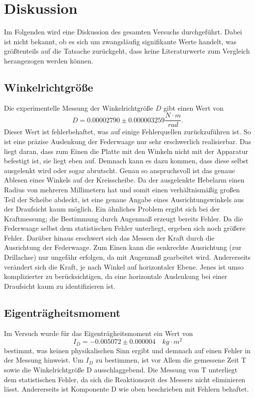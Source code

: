 \section{Diskussion}
\label{sec:Diskussion}

Im Folgenden wird eine Diskussion des gesamten Versuchs durchgeführt. Dabei
ist nicht bekannt, ob es sich um zwangsläufig signifikante Werte handelt, was
größtenteils auf die Tatsache zurückgeht, dass keine Literaturwerte zum 
Vergleich herangezogen werden können.

\subsection{Winkelrichtgröße}
\label{chap:winkelrichtgroesse}
Die experimentelle Messung der Winkelrichtgröße $D$ gibt einen Wert von
\begin{equation}
    D = 0.00002790 \pm 0.000003259 \frac{N \cdot m}{rad}.
\end{equation}
Dieser Wert ist fehlerbehaftet, was auf einige Fehlerquellen zurückzuführen
ist. So ist eine präzise Auslenkung der Federwaage nur sehr erschwerlich
realisierbar. Das liegt daran, dass zum Einen die Platte mit den Winkeln
nicht mit der Apparatur befestigt ist, sie liegt eben auf. Demnach kann es
dazu kommen, dass diese selbst ausgelenkt wird oder sogar abrutscht. Genau
so anspruchsvoll ist das genaue Ablesen eines Winkels auf der Kreisscheibe.
Da der ausgelenkte Hebelarm einen Radius von mehreren Millimetern hat und
somit einen verhältnismäßig großen Teil der Scheibe abdeckt, ist eine 
genaue Angabe eines Ausrichtungswinkels aus der Draufsicht kaum möglich. Ein
ähnliches Problem ergibt sich bei der Kraftmessung; die Bestimmung durch
Augenmaß erzeugt bereits Fehler. Da die Federwaage selbst dem statistischen
Fehler unterliegt, ergeben sich noch größere Fehler. Darüber hinaus erschwert
sich das Messen der Kraft durch die Ausrichtung der Federwaage. Zum Einen
kann die senkrechte Ausrichtung (zur Drillachse) nur ungefähr erfolgen, da
mit Augenmaß gearbeitet wird. Andererseits verändert sich die Kraft, je nach
Winkel auf horizontaler Ebene. Jenes ist umso komplizierter zu berücksichtigen,
da eine horizontale Auslenkung bei einer Draufsicht kaum zu identifizieren ist.

\subsection{Eigenträgheitsmoment}
\label{chap:eigentraeg}
Im Versuch wurde für das Eigenträgheitsmoment ein Wert von
\begin{equation*}
    I_D = -0.005072 \pm 0.000004 \quad kg \cdot m^2
\end{equation*}
bestimmt, was keinen physikalischen Sinn ergibt und demnach auf einen Fehler
in der Messung hinweist. Um $I_D$ zu bestimmen, ist vor Allem die gemessene 
Zeit T sowie die Winkelrichtgröße D ausschlaggebend. Die Messung von T 
unterliegt dem statistischen Fehler, da sich die Reaktionszeit des Messers 
nicht eliminieren lässt. Andererseits ist Komponente D wie oben beschrieben 
mit Fehlern behaftet.

